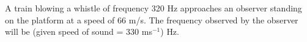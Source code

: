 \item A train blowing a whistle of frequency 320 Hz approaches an observer standing on the platform at a speed of 66 m/s. The frequency observed by the observer will be (given speed of sound = 330 ms\(^{-1}\)) \underline{\hspace{2.5cm}} Hz.
